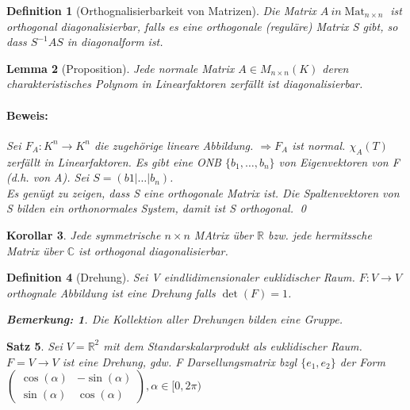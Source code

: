 \documentclass{report}
\newcommand{\al}{\alpha}
\newcommand{\R}{\mathbb{R}}
\newcommand{\C}{\mathbb{C}}
\newcommand{\ve}[1]{{\begin{pmatrix}#1 \end{pmatrix}}}
\DeclareMathOperator{\Mat}{Mat}
\theoremstyle{customrem}
\newtheorem*{bemerkung}{Bemerkung\textnormal:}
\theoremstyle{customdef}
\newtheorem{definition}{Definition}[chapter]
\newtheorem{lemma}[definition]{Lemma}
\newtheorem{korrolar}[definition]{Korollar}
\newtheorem{satz}[definition]{Satz}
\renewenvironment{proof}{\paragraph{Beweis: }}{\qed}
\theoremstyle{customenv}
\begin{document}
\begin{definition}[Orthognalisierbarkeit von Matrizen]
  Die Matrix \(A \ in \Mat_{n \times n}\) ist orthogonal diagonalisierbar, falls
  es eine orthogonale (regul\"are) Matrix S gibt, so dass
  \(S^{-1}AS\) in diagonalform ist.
\end{definition}

\begin{lemma}[Proposition]
  Jede normale Matrix \(A \in M_{n \times n}(K)\) deren charakteristisches
  Polynom in Linearfaktoren zerf\"allt ist diagonalisierbar.
  \begin{proof}
    Sei \(F_A : K^n \to K^n\) die zugeh\"orige lineare Abbildung.
    \(\Rightarrow F_A\) ist normal. \(\chi_A(T)\) zerf\"allt in Linearfaktoren.
    Es gibt eine ONB \(\{b_1, \dots, b_n\}\) von Eigenvektoren von F
    (d.h. von A). Sei \(S = (b1 | \dots | b_n)\).\\
    Es gen\"ugt zu zeigen, dass S eine orthogonale Matrix ist. Die
    Spaltenvektoren von S bilden ein orthonormales System, damit ist S
    orthogonal.
  \end{proof}
\end{lemma}

\begin{korrolar}
  Jede symmetrische \(n \times n\) MAtrix \"uber \(\R\) bzw. jede
  hermitssche Matrix \"uber \(\C\) ist orthogonal diagonalisierbar.
\end{korrolar}

\begin{definition}[Drehung]
  Sei V eindlidimensionaler euklidischer Raum. \(F : V \to V\) orthognale
  Abbildung ist eine Drehung falls \(\det(F) = 1\).
  \begin{bemerkung}
    Die Kollektion aller Drehungen bilden eine Gruppe.
  \end{bemerkung}
\end{definition}

\begin{satz}
  Sei \(V = \R^2\) mit dem Standarskalarprodukt als euklidischer Raum.
  \(F = V \to V\) ist eine Drehung, gdw. F Darsellungsmatrix bzgl
  \(\{e_1, e_2\}\) der Form\\
  \(
  \ve {
    \cos(\al) & -\sin(\al)\\
    \sin(\al) & \cos(\al)
  },
  \al \in [0, 2 \pi)
  \)
\end{satz}

\newpage
\renewcommand{\listtheoremname}{Satz- und Definitionsverzeichnis}
\newpage
\printindex
\end{document}
